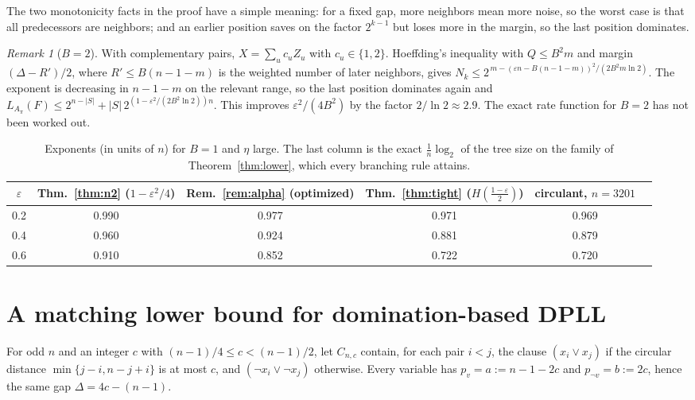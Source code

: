 \documentclass[11pt,a4paper]{article}
\theoremstyle{remark}
\newtheorem{remark}[theorem]{Remark}
\begin{document}
The two monotonicity facts in the proof have a simple meaning: for a fixed
gap, more neighbors mean more noise, so the worst case is that all predecessors
are neighbors; and an earlier position saves on the factor $2^{k-1}$ but loses
more in the margin, so the last position dominates.

\begin{remark}[$B=2$]\label{rem:b2}
With complementary pairs, $X=\sum_uc_uZ_u$ with $c_u\in\{1,2\}$. Hoeffding's
inequality with $Q\le B^2m$ and margin $(\Delta-R')/2$, where $R'\le B(n-1-m)$
is the weighted number of later neighbors, gives
$N_k\le2^{\,m-(\varepsilon n-B(n-1-m))^2/(2B^2m\ln2)}$. The exponent is
decreasing in $n-1-m$ on the relevant range, so the last position dominates
again and $L_{A_\pi}(F)\le2^{n-|S|}+|S|\,2^{(1-\varepsilon^2/(2B^2\ln2))n}$.
This improves $\varepsilon^2/(4B^2)$ by the factor $2/\ln2\approx2.9$. The
exact rate function for $B=2$ has not been worked out.
\end{remark}

\begin{table}[h]
\centering
\begin{tabular}{@{}cccccc@{}}
\toprule
$\varepsilon$ & Thm.~\ref{thm:n2} ($1-\varepsilon^2/4$) &
Rem.~\ref{rem:alpha} (optimized) & Thm.~\ref{thm:tight}
($H(\frac{1-\varepsilon}2)$) & circulant, $n=3201$ \\
\midrule
0.2 & 0.990 & 0.977 & 0.971 & 0.969 \\
0.4 & 0.960 & 0.924 & 0.881 & 0.879 \\
0.6 & 0.910 & 0.852 & 0.722 & 0.720 \\
\bottomrule
\end{tabular}
\caption{Exponents (in units of $n$) for $B=1$ and $\eta$ large. The last
column is the exact $\tfrac1n\log_2$ of the tree size on the family of
Theorem~\ref{thm:lower}, which every branching rule attains.}
\label{tab:exponents}
\end{table}

\section{A matching lower bound for domination-based DPLL}

For odd $n$ and an integer $c$ with $(n-1)/4\le c<(n-1)/2$, let $C_{n,c}$
contain, for each pair $i<j$, the clause $(x_i\lor x_j)$ if the circular
distance $\min\{j-i,n-j+i\}$ is at most $c$, and $(\neg x_i\lor\neg x_j)$
otherwise. Every variable has $p_v=a:=n-1-2c$ and $p_{\neg v}=b:=2c$, hence
the same gap $\Delta=4c-(n-1)$.
\end{document}
